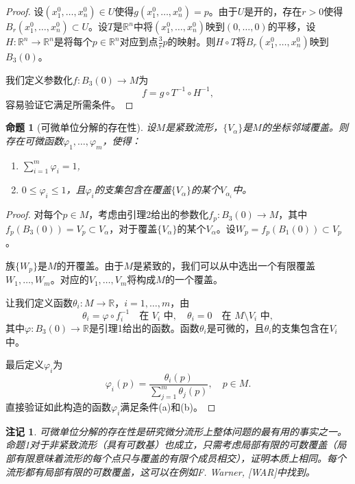 \documentclass[12pt,a4paper]{ctexbook}
\newtheorem{proposition}[theorem]{命题}
\newtheorem{remark}[theorem]{注记}
\begin{document}
\begin{proof}
设$(x_1^0,\ldots,x_n^0)\in U$使得$g(x_1^0,\ldots,x_n^0)=p$。由于$U$是开的，存在$r>0$使得$B_r(x_1^0,\ldots,x_n^0)\subset U$。设$T$是$\mathbb{R}^n$中将$(x_1^0,\ldots,x_n^0)$映到$(0,\ldots,0)$的平移，设$H:\mathbb{R}^n\to\mathbb{R}^n$是将每个$p\in\mathbb{R}^n$对应到点$\frac{3}{r}p$的映射。则$H\circ T$将$B_r(x_1^0,\ldots,x_n^0)$映到$B_3(0)$。

我们定义参数化$f:B_3(0)\to M$为
$$f = g\circ T^{-1}\circ H^{-1},$$
容易验证它满足所需条件。
\end{proof}

\begin{proposition}[可微单位分解的存在性]
设$M$是紧致流形，$\{V_\alpha\}$是$M$的坐标邻域覆盖。则存在可微函数$\varphi_1,\ldots,\varphi_m$，使得：
\begin{enumerate}[label=\alph*)]
    \item $\sum_{i=1}^m \varphi_i = 1$,
    \item $0\leq \varphi_i\leq 1$，且$\varphi_i$的支集包含在覆盖$\{V_\alpha\}$的某个$V_{\alpha_i}$中。
\end{enumerate}
\end{proposition}

\begin{proof}
对每个$p\in M$，考虑由引理2给出的参数化$f_p:B_3(0)\to M$，其中$f_p(B_3(0))=V_p\subset V_\alpha$，对于覆盖$\{V_\alpha\}$的某个$V_\alpha$。设$W_p = f_p(B_1(0))\subset V_p$。

族$\{W_p\}$是$M$的开覆盖。由于$M$是紧致的，我们可以从中选出一个有限覆盖$W_1,\ldots,W_m$。对应的$V_1,\ldots,V_m$将构成$M$的一个覆盖。

让我们定义函数$\theta_i:M\to\mathbb{R}$，$i=1,\ldots,m$，由
$$\theta_i = \varphi\circ f_i^{-1}\quad \text{在 } V_i\text{ 中},\quad \theta_i = 0\quad \text{在 } M\setminus V_i\text{ 中},$$
其中$\varphi:B_3(0)\to\mathbb{R}$是引理1给出的函数。函数$\theta_i$是可微的，且$\theta_i$的支集包含在$V_i$中。

最后定义$\varphi_i$为
$$\varphi_i(p) = \frac{\theta_i(p)}{\sum_{j=1}^m \theta_j(p)},\quad p\in M.$$
直接验证如此构造的函数$\varphi_i$满足条件(a)和(b)。
\end{proof}

\begin{remark}
可微单位分解的存在性是研究微分流形上整体问题的最有用的事实之一。命题1对于非紧致流形（具有可数基）也成立，只需考虑局部有限的可数覆盖（局部有限意味着流形的每个点只与覆盖的有限个成员相交），证明本质上相同。每个流形都有局部有限的可数覆盖，这可以在例如F. Warner, [WAR]中找到。
\end{remark}
\end{document}
